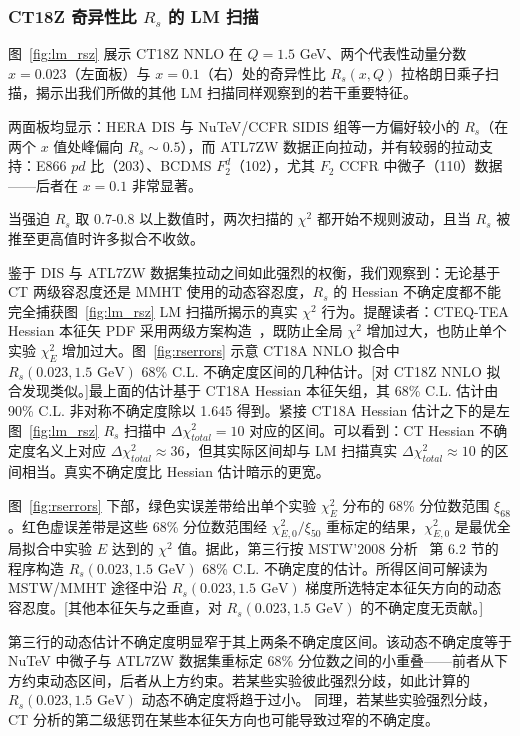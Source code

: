 \subsubsection{CT18Z 奇异性比 $R_s$ 的 LM 扫描}
\label{sec:LMRsCT18Z}

图~\ref{fig:lm_rsz} 展示 CT18Z NNLO 在 $Q\!=\!1.5$ GeV、两个代表性动量分数
$x\!=\!0.023$（左面板）与 $x\!=\!0.1$（右）处的奇异性比 $R_s(x,Q)$ 拉格朗日乘子扫描，揭示出我们所做的其他 LM 扫描同样观察到的若干重要特征。

两面板均显示：HERA DIS 与 NuTeV/CCFR SIDIS 组等一方偏好较小的 $R_s$（在两个 $x$ 值处峰偏向 $R_s\!\sim\! 0.5$），而 ATL7ZW 数据正向拉动，并有较弱的拉动支持：E866 $pd$ 比（203）、BCDMS $F_2^d$（102），尤其 $F_2$ CCFR 中微子（110）数据——后者在 $x=0.1$ 非常显著。

当强迫 $R_s$ 取 0.7-0.8 以上数值时，两次扫描的 $\chi^2$
都开始不规则波动，且当 $R_s$ 被推至更高值时许多拟合不收敛。

鉴于 DIS 与 ATL7ZW 数据集拉动之间如此强烈的权衡，我们观察到：无论基于 CT 两级容忍度还是 MMHT 使用的动态容忍度，$R_s$ 的 Hessian 不确定度都不能完全捕获图~\ref{fig:lm_rsz} LM 扫描所揭示的真实 $\chi^2$ 行为。提醒读者：CTEQ-TEA Hessian 本征矢 PDF 采用两级方案构造~\cite{Lai:2010vv,Gao:2013xoa}，既防止全局 $\chi^2$ 增加过大，也防止单个实验 $\chi^2_E$ 增加过大。图~\ref{fig:rserrors} 示意 CT18A NNLO 拟合中 $R_s(0.023,1.5\mbox{ GeV})$ 68\% C.L. 不确定度区间的几种估计。[对 CT18Z NNLO 拟合发现类似。]最上面的估计基于 CT18A Hessian 本征矢组，其 68\% C.L. 估计由 90\% C.L. 非对称不确定度除以 1.645 得到。紧接 CT18A Hessian 估计之下的是左图~\ref{fig:lm_rsz} $R_s$ 扫描中 $\Delta \chi^2_{total}=10$ 对应的区间。可以看到：CT Hessian 不确定度名义上对应 $\Delta \chi^2_{total}\approx 36$，但其实际区间却与 LM 扫描真实 $\Delta \chi^2_{total}\approx 10$ 的区间相当。真实不确定度比 Hessian 估计暗示的更宽。

图~\ref{fig:rserrors} 下部，绿色实误差带给出单个实验 $\chi^2_E$ 分布的 68\% 分位数范围 $\xi_{68}$。红色虚误差带是这些 68\% 分位数范围经 $\chi^2_{E,0}/\xi_{50}$ 重标定的结果，$\chi^2_{E,0}$ 是最优全局拟合中实验 $E$ 达到的 $\chi^2$ 值。据此，第三行按 MSTW'2008 分析~\cite{Martin:2009iq} 第 6.2 节的程序构造 $R_s(0.023,1.5\mbox{ GeV})$ 68\% C.L. 不确定度的估计。所得区间可解读为 MSTW/MMHT 途径中沿 $R_s(0.023,1.5\mbox{ GeV})$ 梯度所选特定本征矢方向的动态容忍度。[其他本征矢与之垂直，对 $R_s(0.023,1.5\mbox{ GeV})$ 的不确定度无贡献。]

第三行的动态估计不确定度明显窄于其上两条不确定度区间。该动态不确定度等于 NuTeV 中微子与 ATL7ZW 数据集重标定 68\% 分位数之间的小重叠——前者从下方约束动态区间，后者从上方约束。若某些实验彼此强烈分歧，如此计算的 $R_s(0.023,1.5\mbox{ GeV})$ 动态不确定度将趋于过小。
同理，若某些实验强烈分歧，CT 分析的第二级惩罚在某些本征矢方向也可能导致过窄的不确定度。

